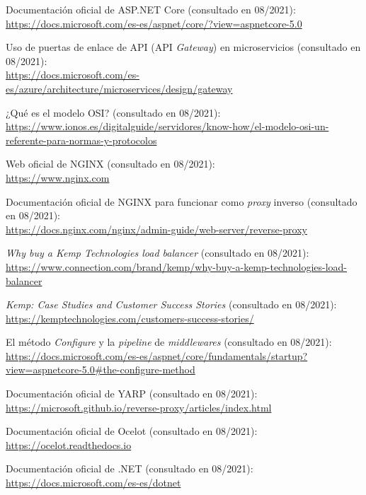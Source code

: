 \documentclass[11pt,spanish,listoffigures]{tfgetsinf}
\begin{document}
\begin{thebibliography}{10}
Documentación oficial de ASP.NET Core (consultado en 08/2021):\\
\url{https://docs.microsoft.com/es-es/aspnet/core/?view=aspnetcore-5.0}

Uso de puertas de enlace de API (API \emph{Gateway}) en microservicios (consultado en 08/2021):\\
\url{https://docs.microsoft.com/es-es/azure/architecture/microservices/design/gateway}

¿Qué es el modelo OSI? (consultado en 08/2021):\\
\url{https://www.ionos.es/digitalguide/servidores/know-how/el-modelo-osi-un-referente-para-normas-y-protocolos}

Web oficial de NGINX (consultado en 08/2021):\\
\url{https://www.nginx.com}

Documentación oficial de NGINX para funcionar como \emph{proxy} inverso (consultado en 08/2021):\\
\url{https://docs.nginx.com/nginx/admin-guide/web-server/reverse-proxy}

\emph{Why buy a Kemp Technologies load balancer} (consultado en 08/2021):\\
\url{https://www.connection.com/brand/kemp/why-buy-a-kemp-technologies-load-balancer}

\emph{Kemp: Case Studies and Customer Success Stories} (consultado en 08/2021):\\
\url{https://kemptechnologies.com/customers-success-stories/}

El método \emph{Configure} y la \emph{pipeline} de \emph{middlewares} (consultado en 08/2021):\\
\url{https://docs.microsoft.com/es-es/aspnet/core/fundamentals/startup?view=aspnetcore-5.0#the-configure-method}

Documentación oficial de YARP (consultado en 08/2021):\\
\url{https://microsoft.github.io/reverse-proxy/articles/index.html}

Documentación oficial de Ocelot (consultado en 08/2021):\\
\url{https://ocelot.readthedocs.io}

Documentación oficial de .NET (consultado en 08/2021):\\
\url{https://docs.microsoft.com/es-es/dotnet}


\end{thebibliography}
\end{document}
